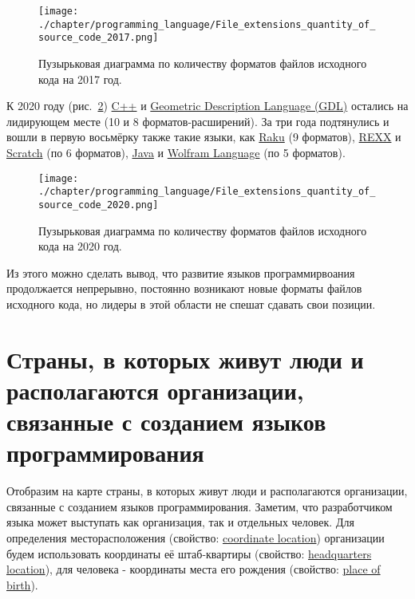 \begin{figure}
\centering
	\texttt{[image: ./chapter/programming\_language/File\_extensions\_quantity\_of\_source\_code\_2017.png]}
	\label{fig:source_format_2017}
	\caption{Пузырьковая диаграмма по количеству форматов файлов исходного кода на 2017 год.}
\end{figure}
К 2020 году (рис.~\ref{fig:source_format_2020}) \href{https://en.wikipedia.org/wiki/C++}{C++} и \href{https://en.wikipedia.org/wiki/Geometric_Description_Language}{Geometric Description Language (GDL)} остались на лидирующем месте (10 и 8 форматов-расширений). За три года подтянулись и вошли в первую восьмёрку также такие языки, как \href{https://en.wikipedia.org/wiki/Raku_(programming_language)}{Raku} (9 форматов), \href{https://en.wikipedia.org/wiki/Rexx}{REXX} и \href{https://en.wikipedia.org/wiki/Scratch_(programming_language)}{Scratch} (по 6 форматов), \href{https://ru.wikipedia.org/wiki/Java}{Java} и \href{https://en.wikipedia.org/wiki/Wolfram_Language}{Wolfram Language} (по 5 форматов).
\begin{figure}
\centering
	\texttt{[image: ./chapter/programming\_language/File\_extensions\_quantity\_of\_source\_code\_2020.png]}
	\label{fig:source_format_2020}
	\caption{Пузырьковая диаграмма по количеству форматов файлов исходного кода на 2020 год.}
\end{figure}

Из этого можно сделать вывод, что развитие языков программирвоания продолжается непрерывно, постоянно возникают новые форматы файлов исходного кода, но лидеры в этой области не спешат сдавать свои позиции.

\section{Страны, в которых живут люди и располагаются организации, связанные с созданием языков программирования}

Отобразим на карте страны, в которых живут люди и располагаются организации, связанные с созданием языков программирования. Заметим, что разработчиком языка может выступать как организация, так и отдельных человек. Для определения месторасположения (свойство: \href{https://www.wikidata.org/wiki/Property:P625}{coordinate location}) организации будем использовать координаты её штаб-квартиры (свойство: \href{https://www.wikidata.org/wiki/Property:P159}{headquarters location}), для человека - координаты места его рождения (свойство: \href{https://www.wikidata.org/wiki/Property:P19}{place of birth}).

